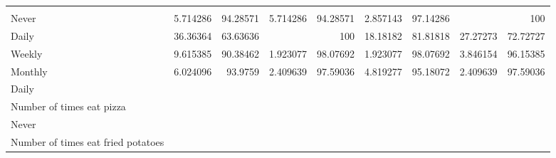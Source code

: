 \documentclass{article}
\begin{document}
\begin{tabular}{lllllllll}
  \multicolumn{1}{r}{} \\
\multicolumn{1}{l}{\hspace{7em}Never} &
  \multicolumn{1}{|r}{5.714286} &
  \multicolumn{1}{r}{94.28571} &
  \multicolumn{1}{r}{5.714286} &
  \multicolumn{1}{r}{94.28571} &
  \multicolumn{1}{r}{2.857143} &
  \multicolumn{1}{r}{97.14286} &
  \multicolumn{1}{r}{} &
  \multicolumn{1}{r}{100} \\
\multicolumn{1}{l}{\hspace{7em}Daily} &
  \multicolumn{1}{|r}{36.36364} &
  \multicolumn{1}{r}{63.63636} &
  \multicolumn{1}{r}{} &
  \multicolumn{1}{r}{100} &
  \multicolumn{1}{r}{18.18182} &
  \multicolumn{1}{r}{81.81818} &
  \multicolumn{1}{r}{27.27273} &
  \multicolumn{1}{r}{72.72727} \\
\multicolumn{1}{l}{\hspace{7em}Weekly} &
  \multicolumn{1}{|r}{9.615385} &
  \multicolumn{1}{r}{90.38462} &
  \multicolumn{1}{r}{1.923077} &
  \multicolumn{1}{r}{98.07692} &
  \multicolumn{1}{r}{1.923077} &
  \multicolumn{1}{r}{98.07692} &
  \multicolumn{1}{r}{3.846154} &
  \multicolumn{1}{r}{96.15385} \\
\multicolumn{1}{l}{\hspace{7em}Monthly} &
  \multicolumn{1}{|r}{6.024096} &
  \multicolumn{1}{r}{93.9759} &
  \multicolumn{1}{r}{2.409639} &
  \multicolumn{1}{r}{97.59036} &
  \multicolumn{1}{r}{4.819277} &
  \multicolumn{1}{r}{95.18072} &
  \multicolumn{1}{r}{2.409639} &
  \multicolumn{1}{r}{97.59036} \\
\multicolumn{1}{l}{\hspace{3em}Daily} &
  \multicolumn{1}{|r}{} &
  \multicolumn{1}{r}{} &
  \multicolumn{1}{r}{} &
  \multicolumn{1}{r}{} &
  \multicolumn{1}{r}{} &
  \multicolumn{1}{r}{} &
  \multicolumn{1}{r}{} &
  \multicolumn{1}{r}{} \\
\multicolumn{1}{l}{\hspace{4em}Number of times eat pizza} &
  \multicolumn{1}{|r}{} &
  \multicolumn{1}{r}{} &
  \multicolumn{1}{r}{} &
  \multicolumn{1}{r}{} &
  \multicolumn{1}{r}{} &
  \multicolumn{1}{r}{} &
  \multicolumn{1}{r}{} &
  \multicolumn{1}{r}{} \\
\multicolumn{1}{l}{\hspace{5em}Never} &
  \multicolumn{1}{|r}{} &
  \multicolumn{1}{r}{} &
  \multicolumn{1}{r}{} &
  \multicolumn{1}{r}{} &
  \multicolumn{1}{r}{} &
  \multicolumn{1}{r}{} &
  \multicolumn{1}{r}{} &
  \multicolumn{1}{r}{} \\
\multicolumn{1}{l}{\hspace{6em}Number of times eat fried potatoes} &

\end{tabular}
\end{document}
